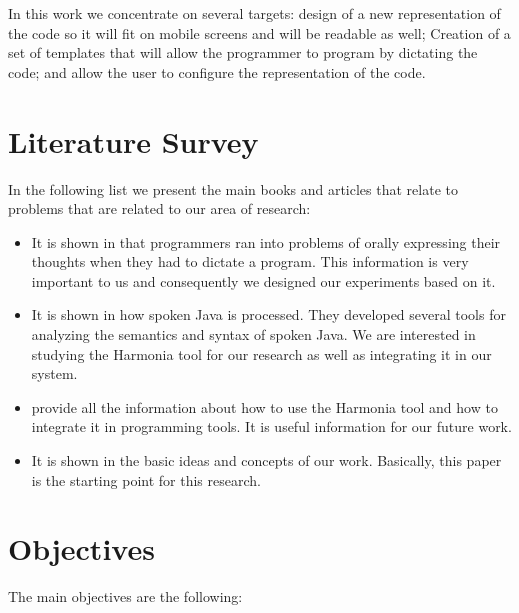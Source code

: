 In this work we concentrate on several targets: design of a new representation of the code so it will fit on mobile screens and will be readable as well; Creation of a set of templates that will allow the programmer to program by dictating the code; and allow the user to configure the representation of the code.
\section{Literature Survey}
In the following list we present the main books and articles that relate to problems that are related to our area of research:

\begin{itemize}
	\item It is shown in \citet[Chap. 2]{andrew11} that programmers ran into problems of orally expressing their thoughts when they had to dictate a program. This information is very important to us and consequently we designed our experiments based on it.
	\item It is shown in \citet[Chap. 3]{andrew11} how spoken Java is processed. They developed several tools for analyzing the semantics and syntax of spoken Java. We are interested in studying the Harmonia tool for our research as well as integrating it in our system.
	\item \citet{harmonia} provide all the information about how to use the Harmonia tool and how to integrate it in programming tools. It is useful information for our future work.
	\item It is shown in \citet[Programming By Voice and Touch]{yishai13} the basic ideas and concepts of our work. Basically, this paper is the starting point for this research.
\end{itemize}
\section{Objectives}
The main objectives are the following:

